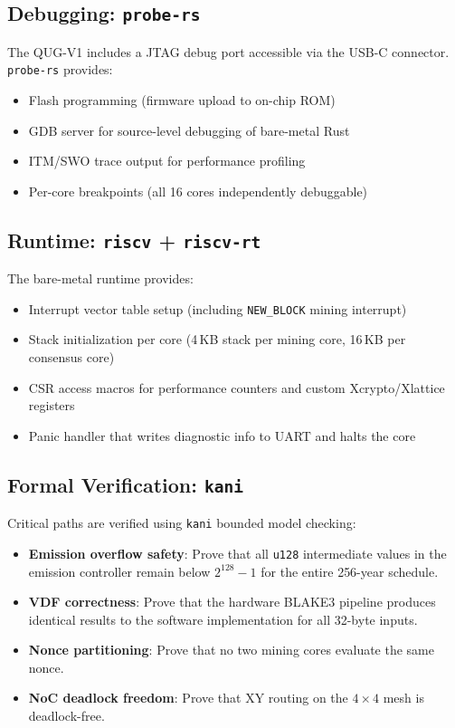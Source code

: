 \documentclass[11pt,a4paper]{article}
\begin{document}
\subsection{Debugging: \texttt{probe-rs}}

The QUG-V1 includes a JTAG debug port accessible via the USB-C connector. \texttt{probe-rs} provides:

\begin{itemize}
    \item Flash programming (firmware upload to on-chip ROM)
    \item GDB server for source-level debugging of bare-metal Rust
    \item ITM/SWO trace output for performance profiling
    \item Per-core breakpoints (all 16 cores independently debuggable)
\end{itemize}

\subsection{Runtime: \texttt{riscv} + \texttt{riscv-rt}}

The bare-metal runtime provides:

\begin{itemize}
    \item Interrupt vector table setup (including \texttt{NEW\_BLOCK} mining interrupt)
    \item Stack initialization per core (4\,KB stack per mining core, 16\,KB per consensus core)
    \item CSR access macros for performance counters and custom Xcrypto/Xlattice registers
    \item Panic handler that writes diagnostic info to UART and halts the core
\end{itemize}

\subsection{Formal Verification: \texttt{kani}}

Critical paths are verified using \texttt{kani} bounded model checking:

\begin{itemize}
    \item \textbf{Emission overflow safety}: Prove that all \texttt{u128} intermediate values in the emission controller remain below $2^{128} - 1$ for the entire 256-year schedule.
    \item \textbf{VDF correctness}: Prove that the hardware BLAKE3 pipeline produces identical results to the software implementation for all 32-byte inputs.
    \item \textbf{Nonce partitioning}: Prove that no two mining cores evaluate the same nonce.
    \item \textbf{NoC deadlock freedom}: Prove that XY routing on the $4 \times 4$ mesh is deadlock-free.
\end{itemize}
\end{document}
